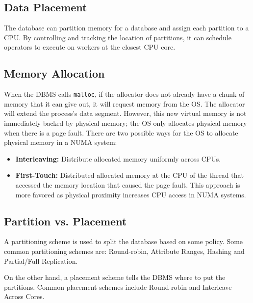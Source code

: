 \documentclass[11pt]{article}
\begin{document}
\subsection*{Data Placement}
The database can partition memory for a database and assign each partition to a CPU. By controlling and tracking the location of partitions, it can schedule operators to execute on workers at the closest CPU core.

\subsection*{Memory Allocation}
When the DBMS calls \texttt{malloc}, if the allocator does not already have a chunk of memory that it can give out, it will request memory from the OS. The allocator will extend the process's data segment. However, this new virtual memory is not immediately backed by physical memory; the OS only allocates physical memory when there is a page fault. There are two possible ways for the OS to allocate physical memory in a NUMA system:
\begin{itemize}
  \item \textbf{Interleaving: } Distribute allocated memory uniformly across CPUs.
  \item \textbf{First-Touch: } Distributed allocated memory at the CPU of the thread that accessed the memory location that caused the page fault. This approach is more favored as physical proximity increases CPU access in NUMA systems.
\end{itemize}

\subsection*{Partition vs. Placement}
A partitioning scheme is used to split the database based on some policy. Some common partitioning schemes are: Round-robin, Attribute Ranges, Hashing and Partial/Full Replication. 

On the other hand, a placement scheme tells the DBMS where to put the partitions. Common placement schemes include Round-robin and Interleave Across Cores.
\end{document}
